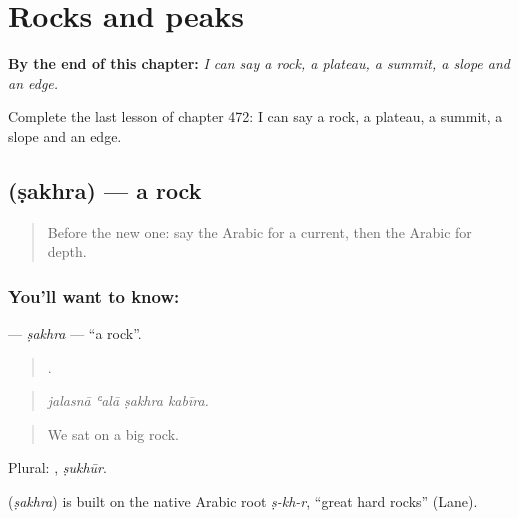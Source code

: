 
\chapter{Rocks and peaks}
\label{ch:ar-rocks-and-peaks}

\begin{chapteropening}
\textbf{By the end of this chapter:} \emph{I can say a rock, a plateau, a summit, a slope and an edge.}

Complete the last lesson of chapter 472: I can say a rock, a plateau, a summit, a slope and an edge.
\end{chapteropening}

\section[\texorpdfstring{\ar{صخرة} (ṣakhra)}{صخرة (ṣakhra)}]{ (ṣakhra) — a rock}

\label{lesson:AR-C472-sakhra}



\begin{quote}
Before the new one: say the Arabic for a current, then the Arabic for depth.
\end{quote}

\subsection*{You'll want to know: }
\textbf{} — \emph{ṣakhra} — \textquotedblleft{}a rock\textquotedblright{}.

\begin{quote}
   .
\end{quote}

\begin{quote}
\emph{jalasnā ʿalā ṣakhra kabīra.}
\end{quote}

\begin{quote}
We sat on a big rock.
\end{quote}

Plural: , \emph{ṣukhūr}.

\begin{cousinweb}
\textbf{} (\emph{ṣakhra}) is built on the native Arabic root \emph{ṣ-kh-r}, \textquotedblleft{}great hard rocks\textquotedblright{} (Lane).
\end{cousinweb}

